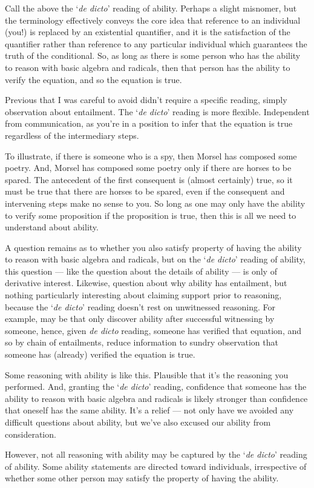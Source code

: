 \begin{note}
  Call the above the `\emph{de dicto}' reading of ability.
  Perhaps a slight misnomer, but the terminology effectively conveys the core idea that reference to an individual (you!) is replaced by an existential quantifier, and it is the satisfaction of the quantifier rather than reference to any particular individual which guarantees the truth of the conditional.
  So, as long as there is some person who has the ability to reason with basic algebra and radicals, then that person has the ability to verify the equation, and so the equation is true.

  Previous that I was careful to avoid didn't require a specific reading, simply observation about entailment.
  The `\emph{de dicto}' reading is more flexible.
  Independent from communication, as you're in a position to infer that the equation is true regardless of the intermediary steps.

  To illustrate, if there is someone who is a spy, then Morsel has composed some poetry.
  And, Morsel has composed some poetry only if there are horses to be spared.
  The antecedent of the first consequent is (almost certainly) true, so it must be true that there are horses to be spared, even if the consequent and intervening steps make no sense to you.
  So long as one may only have the ability to verify some proposition if the proposition is true, then this is all we need to understand about ability.

  A question remains as to whether you also satisfy property of having the ability to reason with basic algebra and radicals, but on the `\emph{de dicto}' reading of ability, this question --- like the question about the details of ability --- is only of derivative interest.
  Likewise, question about why ability has entailment, but nothing particularly interesting about claiming support prior to reasoning, because the `\emph{de dicto}' reading doesn't rest on unwitnessed reasoning.
  For example, may be that only discover ability after successful witnessing by someone, hence, given \emph{de dicto} reading, someone has verified that equation, and so by chain of entailments, reduce information to sundry observation that someone has (already) verified the equation is true.

  Some reasoning with ability is like this.
  Plausible that it's the reasoning you performed.
  And, granting the `\emph{de dicto}' reading, confidence that someone has the ability to reason with basic algebra and radicals is likely stronger than confidence that oneself has the same ability.
  It's a relief --- not only have we avoided any difficult questions about ability, but we've also excused our ability from consideration.

  However, not all reasoning with ability may be captured by the `\emph{de dicto}' reading of ability.
  Some ability statements are directed toward individuals, irrespective of whether some other person may satisfy the property of having the ability.
\end{note}

